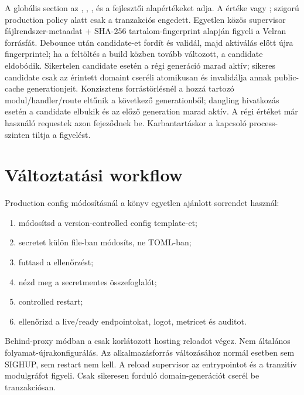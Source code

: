 A globális \code{[reload]} section az , , ,  és a fejlesztői  alapértékeket adja. A  értéke  vagy ; szigorú production policy alatt csak a tranzakciós  engedett. Egyetlen közös supervisor fájlrendszer-metaadat + SHA-256 tartalom-fingerprint alapján figyeli a Velran forrásfát. Debounce után candidate-et fordít és validál, majd aktiválás előtt újra fingerprintel; ha a feltöltés a build közben tovább változott, a candidate eldobódik. Sikertelen candidate esetén a régi generáció marad aktív; sikeres candidate csak az érintett domaint cseréli atomikusan és invalidálja annak public-cache generationjeit. Konzisztens forrástörlésnél a hozzá tartozó modul/handler/route eltűnik a következő generationből; dangling hivatkozás esetén a candidate elbukik és az előző generation marad aktív. A régi  értéket már használó requestek azon fejeződnek be. Karbantartáskor a  kapcsoló process-szinten tiltja a figyelést.

\section{Változtatási workflow}

Production config módosításnál a könyv egyetlen ajánlott sorrendet használ:

\begin{enumerate}
  \item módosítsd a version-controlled config template-et;
  \item secretet külön file-ban módosíts, ne TOML-ban;
  \item futtasd a  ellenőrzést;
  \item nézd meg a  secretmentes összefoglalót;
  \item controlled restart;
  \item ellenőrizd a live/ready endpointokat, logot, metricet és auditot.
\end{enumerate}

Behind-proxy módban a  csak korlátozott hosting reloadot végez. Nem általános folyamat-újrakonfigurálás. Az alkalmazásforrás változásához normál esetben sem SIGHUP, sem restart nem kell. A reload supervisor az entrypointot és a tranzitív modulgráfot figyeli. Csak sikeresen forduló domain-generációt cserél be tranzakciósan.

